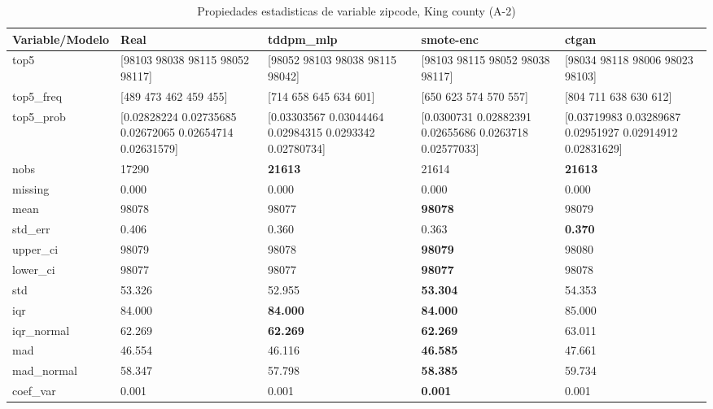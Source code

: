 \begin{table}[H]
\centering
\fontsize{8}{14}\selectfont
\caption{Propiedades  estadisticas de variable zipcode, King county (A-2)}
\label{table-stats-king county-a-2-zipcode}
\begin{tabular}{|l|m{10em}|m{10em}|m{10em}|m{10em}|}
\hline
 \rowcolor[gray]{0.8}
Variable/Modelo & Real & tddpm\_mlp & smote-enc & ctgan \\
\hline top5 & [98103 98038 98115 98052 98117] & [98052 98103 98038 98115 98042] & [98103 98115 98052 98038 98117] & [98034 98118 98006 98023 98103] \\
\hline top5\_freq & [489 473 462 459 455] & [714 658 645 634 601] & [650 623 574 570 557] & [804 711 638 630 612] \\
\hline top5\_prob & [0.02828224 0.02735685 0.02672065 0.02654714 0.02631579] & [0.03303567 0.03044464 0.02984315 0.0293342  0.02780734] & [0.0300731  0.02882391 0.02655686 0.0263718  0.02577033] & [0.03719983 0.03289687 0.02951927 0.02914912 0.02831629] \\
\hline nobs & 17290 & \bfseries 21613 & \cellcolor[rgb]{0.9, 0.54, 0.52} 21614 & \bfseries 21613 \\
\hline missing & 0.000 & 0.000 & 0.000 & 0.000 \\
\hline mean & 98078 & 98077 & \bfseries 98078 & \cellcolor[rgb]{0.9, 0.54, 0.52} 98079 \\
\hline std\_err & 0.406 & \cellcolor[rgb]{0.9, 0.54, 0.52} 0.360 & 0.363 & \bfseries 0.370 \\
\hline upper\_ci & 98079 & 98078 & \bfseries 98079 & \cellcolor[rgb]{0.9, 0.54, 0.52} 98080 \\
\hline lower\_ci & 98077 & 98077 & \bfseries 98077 & \cellcolor[rgb]{0.9, 0.54, 0.52} 98078 \\
\hline std & 53.326 & 52.955 & \bfseries 53.304 & \cellcolor[rgb]{0.9, 0.54, 0.52} 54.353 \\
\hline iqr & 84.000 & \bfseries 84.000 & \bfseries 84.000 & \cellcolor[rgb]{0.9, 0.54, 0.52} 85.000 \\
\hline iqr\_normal & 62.269 & \bfseries 62.269 & \bfseries 62.269 & \cellcolor[rgb]{0.9, 0.54, 0.52} 63.011 \\
\hline mad & 46.554 & 46.116 & \bfseries 46.585 & \cellcolor[rgb]{0.9, 0.54, 0.52} 47.661 \\
\hline mad\_normal & 58.347 & 57.798 & \bfseries 58.385 & \cellcolor[rgb]{0.9, 0.54, 0.52} 59.734 \\
\hline coef\_var & 0.001 & 0.001 & \bfseries 0.001 & \cellcolor[rgb]{0.9, 0.54, 0.52} 0.001 \\

\end{tabular}
\end{table}
